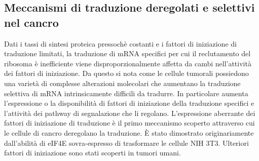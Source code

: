 	\subsection{Meccanismi di traduzione deregolati e selettivi nel cancro}
	Dati i tassi di sintesi proteica pressoch\`e costanti e i fattori di iniziazione di traduzione limitati, la traduzione di mRNA specifici per cui il reclutamento del ribosoma \`e inefficiente viene disproporzionalmente affetta da cambi nell'attivit\`a dei fattori di iniziazione.
	Da questo si nota come le cellule tumorali possiedono una variet\`a di complesse alterazioni molecolari che aumentano la traduzione selettiva di mRNA intrinsicamente difficili da tradurre.
	In particolare aumenta l'espressione o la disponibilit\`a di fattori di iniziazione della traduzione specifici e l'attivit\`a dei pathway di segnalazione che li regolano.
	L'espressione aberrante dei fattori di iniziazione di traduzione \`e il primo meccanismo scoperto attraverso cui le cellule di cancro deregolano la traduzione.
	\`E stato dimostrato originariamente dall'abilit\`a di eIF4E sovra-espresso di trasformare le cellule NIH 3T3.
	Ulteriori fattori di iniziazione sono stati scoperti in tumori umani.

